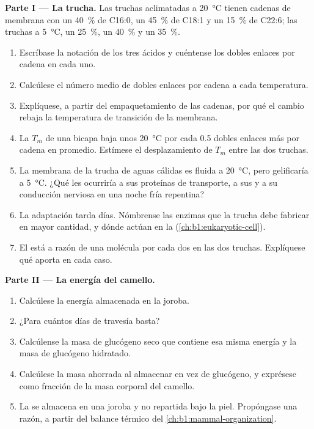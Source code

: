 \begin{problem}
\medskip
\noindent\textbf{Parte I --- La trucha.}
Las truchas aclimatadas a \qty{20}{\celsius} tienen cadenas de membrana con
un \qty{40}{\%} de C16:0, un \qty{45}{\%} de C18:1 y un \qty{15}{\%} de
C22:6; las truchas a \qty{5}{\celsius}, un \qty{25}{\%}, un \qty{40}{\%} y
un \qty{35}{\%}.
\begin{enumerate}
  \item Escríbase la notación de los tres ácidos y cuéntense los dobles
        enlaces por cadena en cada uno.
  \item Calcúlese el número medio de dobles enlaces por cadena a cada
        temperatura.
  \item Explíquese, a partir del empaquetamiento de las cadenas, por qué el
        cambio rebaja la temperatura de transición de la membrana.
  \item La $T_m$ de una bicapa baja unos \qty{20}{\celsius} por cada
        \qty{0.5}{} dobles enlaces más por cadena en promedio. Estímese el
        desplazamiento de $T_m$ entre las dos truchas.
  \item La membrana de la trucha de aguas cálidas es fluida a
        \qty{20}{\celsius}, pero gelificaría a \qty{5}{\celsius}. ¿Qué les
        ocurriría a sus proteínas de transporte, a sus  y a su
        conducción nerviosa en una noche fría repentina?
  \item La adaptación tarda días. Nómbrense las enzimas que la trucha debe
        fabricar en mayor cantidad, y dónde actúan en la 
        (\cref{ch:b1:eukaryotic-cell}).
  \item El  está a razón de una molécula por cada dos
         en las dos truchas. Explíquese qué aporta en cada
        caso.
\end{enumerate}

\medskip
\noindent\textbf{Parte II --- La energía del camello.}
\begin{enumerate}[resume]
  \item Calcúlese la energía almacenada en la joroba.
  \item ¿Para cuántos días de travesía basta?
  \item Calcúlense la masa de glucógeno seco que contiene esa misma energía
        y la masa de glucógeno hidratado.
  \item Calcúlese la masa ahorrada al almacenar  en vez de glucógeno,
        y exprésese como fracción de la masa corporal del camello.
  \item La  se almacena en una joroba y no repartida bajo la piel.
        Propóngase una razón, a partir del balance térmico del
        \cref{ch:b1:mammal-organization}.
\end{enumerate}


\end{problem}
